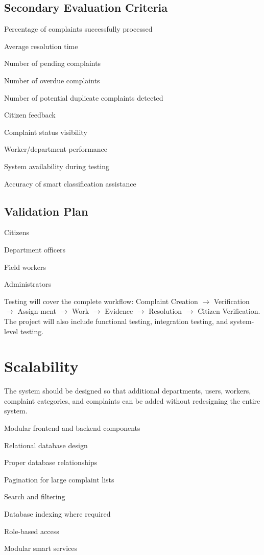 \documentclass[12pt,a4paper]{article}
\begin{document}
\subsection{Secondary Evaluation Criteria}
Percentage of complaints successfully processed

Average resolution time

Number of pending complaints

Number of overdue complaints

Number of potential duplicate complaints detected

Citizen feedback

Complaint status visibility

Worker/department performance

System availability during testing

Accuracy of smart classification assistance

\subsection{Validation Plan}
Citizens

Department officers

Field workers

Administrators

Testing will cover the complete workflow: Complaint Creation $\rightarrow$ Verification $\rightarrow$ Assign-ment $\rightarrow$ Work $\rightarrow$ Evidence $\rightarrow$ Resolution $\rightarrow$ Citizen Verification. The project will also include functional testing, integration testing, and system-level testing.

\section{Scalability}
The system should be designed so that additional departments, users, workers, complaint categories, and complaints can be added without redesigning the entire system.

Modular frontend and backend components

Relational database design

Proper database relationships

Pagination for large complaint lists

Search and filtering

Database indexing where required

Role-based access

Modular smart services
\end{document}
